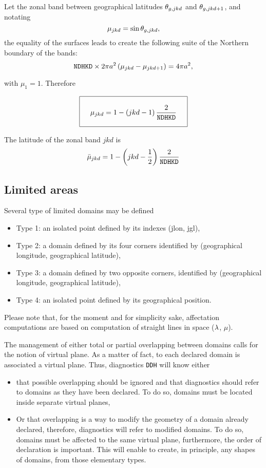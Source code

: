 Let the zonal band between geographical latitudes $\ta_{g,jkd}$ and $\ta_{g,jkd+1}$, and notating
$$ \mu_{jkd} = \sin \ta_{g,jkd}, $$
\noi the equality of the surfaces leads to create the following suite of the Northern  boundary of the bands: 
$$ {\tt NDHKD} \times 2\pi a^2 \lp \mu_{jkd} - \mu_{jkd+1}\rp = 4\pi a^2 ,$$

\noi with $\mu_1 = 1$. Therefore

$$ \bay{|c|} \hline \\
\quad \ds \mu_{jkd} = 1 - \lp jkd -1 \rp \frac 2{\tt NDHKD} \quad \\[3ex]
\hline \eay $$

\noi The latitude of the zonal band $jkd$ is
$$ {\bar \mu}_{jkd} = 1 - \lp jkd - \frac 12 \rp \frac 2{\tt NDHKD} $$

\subsection{Limited areas}

Several type of limited domains may be defined
\begin{itemize}
\item Type 1: an isolated point defined by its indexes (jlon, jgl),
\item Type 2: a domain defined by its four corners identified by (geographical longitude, geographical latitude),
\item Type 3: a domain defined by two opposite corners, identified by (geographical longitude, geographical latitude),
\item Type 4: an isolated point defined by its geographical position.
\end{itemize}

Please note that, for the moment and for simplicity sake, affectation computations are based on computation of straight lines in space ($\la$, $\mu$).

The management of either total or partial overlapping between domains calls for the notion of virtual plane. As a matter of fact, to each declared domain is associated a virtual plane. Thus, diagnostics {\tt DDH} will know either
\begin{itemize}
\item that possible overlapping should be ignored and that diagnostics should refer to domains as they have been declared. To do so, domains must be located inside separate virtual planes, 
\item Or that overlapping is a way to modify the geometry of a domain already
	declared, therefore, diagnostics will refer to modified domains. To do so,
	domains must be affected to the same virtual plane, furthermore, the order of
	declaration is important. This will enable to create, in principle, any shapes
	of domains, from those elementary types.
\end{itemize}

